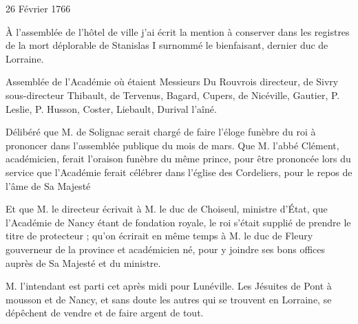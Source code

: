                      \begin{diary}{26 Février 1766}{}

                         À l'assemblée de l'hôtel de ville j'ai écrit la
                           mention à conserver dans les registres
                           de la mort déplorable de Stanislas I surnommé
                              le bienfaisant, dernier duc de Lorraine. \bigskip


                         Assemblée de l'Académie où étaient Messieurs
                           Du Rouvrois
                           directeur, de Sivry
                           sous-directeur
                           Thibault,
                           de Tervenus, Bagard, Cupers, de
                           Nicéville,
                           Gautier, P. Leslie, P. Husson,
                              Coster, Liebault,
                           Durival l'aîné. \bigskip


                         Délibéré que M. de Solignac serait chargé
                           de faire l'éloge funèbre du
                              roi à prononcer
                           dans l'assemblée publique du mois de
                              mars.
                           Que M. l'abbé Clément,
                           académicien, ferait
                           l'oraison funèbre du même prince, pour être
                           prononcée lors du service que l'Académie
                           ferait célébrer dans l’église
                              des Cordeliers,
                           pour le repos de l'âme de Sa Majesté
                        \bigskip


                         Et que M. le directeur écrivait à M.
                              le duc de Choiseul,
                           ministre d’État, que l'Académie
                              de Nancy étant de fondation royale, le roi
                           s'était supplié de prendre le titre de protecteur ;
                           qu'on écrirait en même temps à M. le duc de
                              Fleury gouverneur de la province et académicien
                           né, pour y joindre ses bons offices auprès de
                           Sa Majesté et du ministre. \bigskip



                           M. l'intendant est parti cet après
                           midi
                           pour Lunéville.
                           Les Jésuites de Pont à mousson et de
                              Nancy, et sans
                           doute les autres qui se trouvent en Lorraine,
                           se dépêchent de vendre et de faire argent de tout. \bigskip


                     \end{diary}

